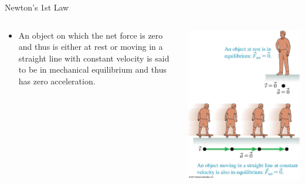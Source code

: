 \documentclass{beamer}
\begin{document}
\begin{frame}{Newton's 1st Law}
\begin{columns}
\begin{column}{0.5\textwidth}
\begin{itemize}
   \item An object on which the net force is zero and thus is either at rest or moving in a straight line with constant velocity is said to be in mechanical equilibrium and thus has zero acceleration.
\end{itemize}
\end{column}
\begin{column}{0.5\textwidth}
\begin{center}
   \includegraphics[width=\textwidth]{../figures/05_18_Figure.jpg}
\end{center}
\end{column}
\end{columns}
\end{frame}
\end{document}
